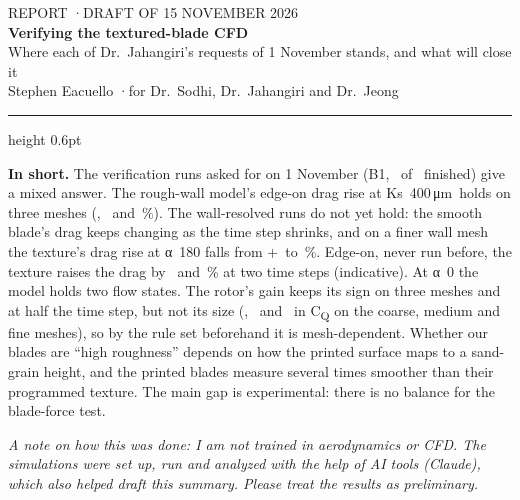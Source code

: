\documentclass[10pt]{article}
\newcommand{\um}{\,\si{\micro\metre}}
\begin{document}
\thispagestyle{empty}
\begin{flushleft}
{\sffamily\small\color{ink2} REPORT \quad·\quad DRAFT OF 15 NOVEMBER 2026}\\[0.4em]
{\sffamily\LARGE\bfseries\color{navy} Verifying the textured-blade CFD}\\[0.3em]
{\sffamily\normalsize Where each of Dr.\ Jahangiri's requests of 1 November stands, and what will close it}\\[0.3em]
{\sffamily\small Stephen Eacuello \quad·\quad for Dr.\ Sodhi, Dr.\ Jahangiri and Dr.\ Jeong}
\end{flushleft}
{\color{rule}\hrule height 0.6pt}
\vspace{0.6em}

\begin{keybox}
\textbf{In short.} The verification runs asked for on 1 November (B1, \nBoneDone\ of \nBoneQueueJobs\
finished) give a mixed answer. The rough-wall model's edge-on drag rise at Ks~400\um\ holds on three
meshes (\nWfMeshNinetyCdC, \nWfMeshNinetyCdM\ and \nWfMeshNinetyCdF\,\%). The wall-resolved runs do not
yet hold: the smooth blade's drag keeps changing as the time step shrinks, and on a finer wall mesh the
texture's drag rise at α~180 falls from +\nTexEffLong\ to \nBoneTTwoEff\,\%. Edge-on, never run before,
the texture raises the drag by \nBoneTexNinetyA\ and \nBoneTexNinetyB\,\% at two time steps
(indicative). At α~0 the model holds two flow states. The rotor's gain keeps its sign on three meshes
and at half the time step, but not its size (\nBoneROneCoarse, \nRotEffTen\ and \nBoneROneFine\ in
C\textsubscript{Q} on the coarse, medium and fine meshes), so by the rule set beforehand it is
mesh-dependent.
Whether our blades are ``high roughness'' depends on how the printed surface maps to a sand-grain height,
and the printed blades measure several times smoother than their programmed texture. The main gap is
experimental: there is no balance for the blade-force test.
\end{keybox}

{\small\textit{A note on how this was done: I am not trained in aerodynamics or CFD. The simulations were set up, run and analyzed with the help of AI tools (Claude), which also helped draft this summary. Please treat the results as preliminary.}}
\end{document}
